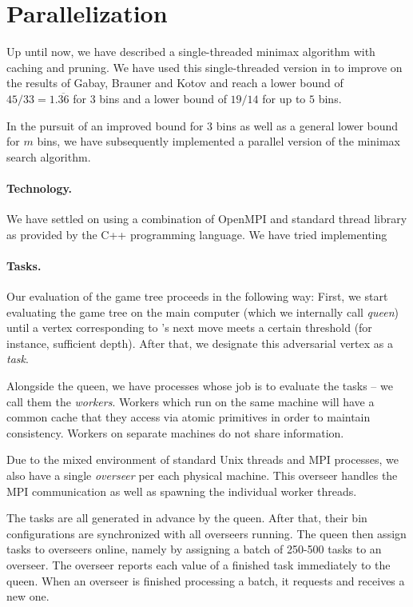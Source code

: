 \section{Parallelization}\label{subsec:para}

Up until now, we have described a single-threaded minimax algorithm
with caching and pruning. We have used this single-threaded version in
\cite{bohm16} to improve on the results of Gabay, Brauner and Kotov
\cite{gabay2013lbv2} and reach a lower bound of $45/33 =
1.\overline{36}$ for $3$ bins and a lower bound of $19/14$ for up to
$5$ bins.

In the pursuit of an improved bound for $3$ bins as well as a general
lower bound for $m$ bins, we have subsequently implemented a parallel
version of the minimax search algorithm.

\paragraph{Technology.} We have settled on using a combination
of OpenMPI \cite{openmpi} and standard thread library as provided
by the C++ programming language. We have tried implementing


\paragraph{Tasks.} Our evaluation of the game tree proceeds in the
following way: First, we start evaluating the game tree on the main
computer (which we internally call \emph{queen}) until a vertex
corresponding to \adversary's next move meets a certain threshold (for
instance, sufficient depth). After that, we designate this adversarial
vertex as a \emph{task}.

Alongside the queen, we have processes whose job is to evaluate the
tasks -- we call them the \emph{workers}. Workers which run on the
same machine will have a common cache that they access via atomic
primitives in order to maintain consistency. Workers on separate
machines do not share information.

Due to the mixed environment of standard Unix threads and MPI
processes, we also have a single \emph{overseer} per each physical
machine. This overseer handles the MPI communication as well as
spawning the individual worker threads.

The tasks are all generated in advance by the queen. After that, their
bin configurations are synchronized with all overseers running. The
queen then assign tasks to overseers online, namely by assigning a
batch of 250-500 tasks to an overseer. The overseer reports each value
of a finished task immediately to the queen. When an overseer is
finished processing a batch, it requests and receives a new one.

